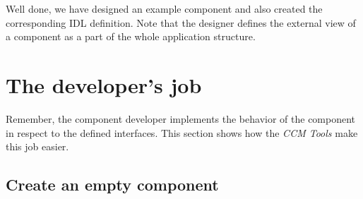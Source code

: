 Well done, we have designed an example component and also created the corresponding
IDL definition. 
Note that the designer defines the external view of a component as a part of the
whole application structure.



\section{The developer's job}

Remember, the component developer implements the behavior of the component in
respect to the defined interfaces. This section shows how the {\it CCM Tools}
make this job easier.


\subsection{Create an empty component}

